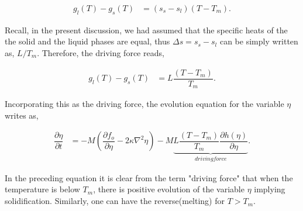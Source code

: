 \documentclass[english]{iambook}
\begin{document}
\begin{align}
 g_l\left(T\right)-g_s\left(T\right) &= \left(s_s-s_l\right)\left(T-T_m\right).
\end{align}

Recall, in the present discussion, we had assumed that the 
specific heats of the the solid and the liquid phases are equal, 
thus $\Delta s = s_s-s_l$ can be simply written as, $L/T_m$.
Therefore, the driving force reads,

\begin{align}
  g_l\left(T\right)-g_s\left(T\right) &= L\dfrac{\left(T-T_m\right)}{T_m}.
\end{align}

Incorporating this as the driving force, the evolution equation for
the variable $\eta$ writes as, 

\begin{align}
 \dfrac{\partial \eta}{\partial t} &= -M \left(\dfrac{\partial f_o}{\partial \eta} - 2\kappa\nabla^{2}\eta\right)  
                                      -M\underbrace{L\dfrac{\left(T-T_m\right)}{T_m}\dfrac{\partial h\left(\eta\right)}{\partial \eta}}_{driving force}.
\end{align}

In the preceding equation it is clear from the term "driving force" that when the temperature
is below $T_m$, there is positive evolution of the variable $\eta$ implying solidification. 
Similarly, one can have the reverse(melting) for $T>T_m$.
\end{document}
